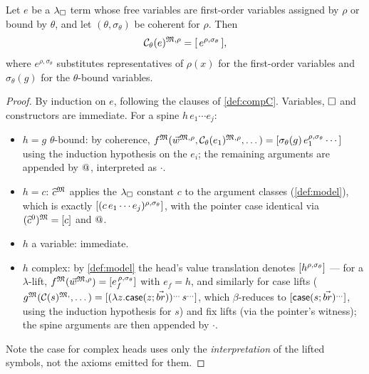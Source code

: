 \begin{lemma}
\label{lem:comp-adequacy}
Let $e$ be a $\lambda_{\square}$ term whose free variables are first-order variables
assigned by $\rho$ or bound by $\theta$, and let $(\theta,
\sigma_\theta)$ be coherent for $\rho$.  Then
\[
  \mathcal{C}_\theta(e)^{\mathfrak{M},\rho} = [\,e^{\rho, \sigma_\theta}\,],
\]
where $e^{\rho,\sigma_\theta}$ substitutes representatives of $\rho(x)$
for the first-order variables and $\sigma_\theta(g)$ for the
$\theta$-bound variables.
\end{lemma}

\begin{proof}
By induction on $e$, following the clauses of \cref{def:compC}.
Variables, $\square$ and constructors are immediate.  For a spine $h\,e_1
\cdots e_j$:
\begin{itemize}[leftmargin=2em]
\item $h = g$ $\theta$-bound: by coherence,
  $f^{\mathfrak{M}}(\vec{w}^{\mathfrak{M},\rho}, \mathcal{C}_\theta(e_1)^{\mathfrak{M},\rho}, \dots) =
  [\sigma_\theta(g)\, e_1^{\rho,\sigma_\theta} \cdots]$ using the
  induction hypothesis on the $e_i$; the remaining arguments are appended
  by $\mathbin{@}$, interpreted as $\cdot$.
\item $h = c$: $\widehat{c}^{\mathfrak{M}}$ applies the $\lambda_{\square}$ constant $c$ to the
  argument classes (\cref{def:model}), which is exactly
  $[(c\,e_1\cdots e_j)^{\rho,\sigma_\theta}]$, with the pointer case
  identical via $(\widehat{c}^0)^{\mathfrak{M}} = [c]$ and $\mathbin{@}$.
\item $h$ a variable: immediate.
\item $h$ complex: by \cref{def:model} the head's value translation
  denotes $[h^{\rho,\sigma_\theta}]$ --- for a $\lambda$-lift,
  $f^{\mathfrak{M}}(\vec{w}^{\mathfrak{M},\rho}) = [e_f^{\,\rho,\sigma_\theta}]$ with
  $e_f = h$, and similarly for case lifts ($g^{\mathfrak{M}}(\mathcal{C}(s)^{\mathfrak{M},},
  \dots) = [(\lambda z.\mathsf{case}(z;\vec{br}))^{\dots}\,
  s^{\dots}]$, which $\beta$-reduces to
  $[\mathsf{case}(s;\vec{br})^{\dots}]$, using the induction
  hypothesis for $s$) and fix lifts (via the pointer's witness);
  the spine arguments are then appended by $\cdot$.
\end{itemize}
Note the case for complex heads uses only the \emph{interpretation} of
the lifted symbols, not the axioms emitted for them.
\end{proof}

